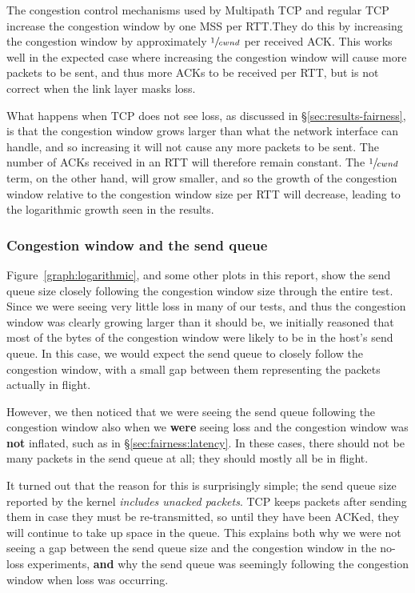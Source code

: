 The congestion control mechanisms used by Multipath TCP and regular TCP
increase the congestion window by one MSS per RTT.\@ They do this by increasing
the congestion window by approximately $\sfrac{1}{cwnd}$ per received ACK.\@
This works well in the expected case where increasing the congestion window will
cause more packets to be sent, and thus more ACKs to be received per RTT, but is not
correct when the link layer masks loss.

What happens when TCP does not see loss, as discussed in \S\ref{sec:results-fairness}, 
is that the congestion window grows larger than what the network 
interface can handle, and so increasing it will not cause any more packets to be 
sent. The number of ACKs received in an RTT will therefore remain constant. The 
$\sfrac{1}{cwnd}$ term, on the other hand, will grow smaller, and so the growth of the 
congestion window relative to the congestion window size per RTT will decrease, 
leading to the logarithmic growth seen in the results.

\subsubsection{Congestion window and the send queue}
\label{sec:closing:sendq}
Figure~\ref{graph:logarithmic}, and some other plots in this report, show the
send queue size closely following the congestion window size through the entire test.
Since we were seeing very little loss in many of our tests, and thus the
congestion window was clearly growing larger than it should be, we initially
reasoned that most of the bytes of the congestion window were likely to be in
the host's send queue. In this case, we would expect the send queue to closely
follow the congestion window, with a small gap between them representing the
packets actually in flight.

However, we then noticed that we were seeing the send queue following the
congestion window also when we \textbf{were} seeing loss and the congestion
window was \textbf{not} inflated, such as in \S\ref{sec:fairness:latency}.
In these cases, there should not be many
packets in the send queue at all; they should mostly all be in flight.

It turned out that the reason for this is surprisingly simple; the send queue
size reported by the kernel \emph{includes unacked packets}. TCP keeps packets
after sending them in case they must be re-transmitted, so until they have been
ACKed, they will continue to take up space in the queue. This explains both why
we were not seeing a gap between the send queue size and the congestion window
in the no-loss experiments, \textbf{and} why the send queue was seemingly
following the congestion window when loss was occurring.

